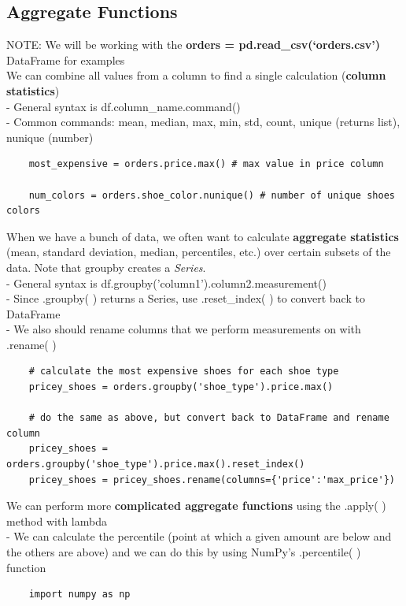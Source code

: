 \documentclass[11pt, a4paper]{article}
\begin{document}
\begin{spacing}{1.1}
	\subsection{Aggregate Functions}
	NOTE: We will be working with the \textbf{orders = pd.read\_csv(`orders.csv')} DataFrame for examples \vspace*{3mm} \\
	We can combine all values from a column to find a single calculation (\textbf{column statistics}) \\
	\hspace*{4mm} - General syntax is df.column\_name.command() \\
	\hspace*{4mm} - Common commands: mean, median, max, min, std, count, unique (returns list), nunique (number)
	\begin{lstlisting}
	most_expensive = orders.price.max() # max value in price column
	
	num_colors = orders.shoe_color.nunique() # number of unique shoes colors \end{lstlisting}\vspace*{1mm}
	When we have a bunch of data, we often want to calculate \textbf{aggregate statistics} (mean, standard deviation, median, percentiles, etc.) over certain subsets of the data. Note that groupby creates a \textit{Series}.\\
	\hspace*{4mm} - General syntax is df.groupby('column1').column2.measurement() \\
	\hspace*{4mm} - Since .groupby( ) returns a Series, use .reset\_index( ) to convert back to DataFrame \\
	\hspace*{4mm} - We also should rename columns that we perform measurements on with .rename( ) \newpage

	\begin{lstlisting}
	# calculate the most expensive shoes for each shoe type
	pricey_shoes = orders.groupby('shoe_type').price.max() 
	
	# do the same as above, but convert back to DataFrame and rename column
	pricey_shoes = orders.groupby('shoe_type').price.max().reset_index()	
	pricey_shoes = pricey_shoes.rename(columns={'price':'max_price'}) \end{lstlisting}\vspace*{1mm}
	We can perform more \textbf{complicated aggregate functions} using the .apply( ) method with lambda \\
	\hspace*{4mm} - We can calculate the percentile (point at which a given amount are below and the others are above) \hspace*{7mm} and we can do this by using NumPy's .percentile( ) function
	\begin{lstlisting}
	import numpy as np
	

\end{lstlisting}
\end{spacing}
\end{document}
